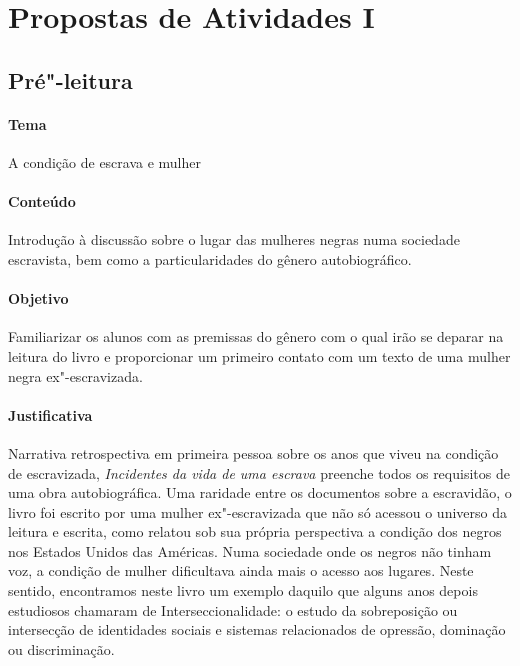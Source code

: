 \documentclass[11pt]{extarticle}
\begin{document}
\tableofcontents


\section{Propostas de Atividades I}


\subsection{Pré"-leitura}

\paragraph{Tema} A condição de escrava e mulher

\paragraph{Conteúdo} Introdução à discussão sobre o lugar das mulheres negras
numa sociedade escravista, bem como a particularidades do gênero autobiográfico.

\paragraph{Objetivo} Familiarizar os alunos com as premissas do gênero com o qual
irão se deparar na leitura do livro e proporcionar um primeiro contato com um texto
de uma mulher negra ex"-escravizada.

\paragraph{Justificativa} Narrativa retrospectiva em primeira pessoa sobre os anos 
que viveu na condição de escravizada, \emph{Incidentes da vida de uma escrava} 
preenche todos os requisitos de uma obra autobiográfica. Uma raridade entre os 
documentos sobre a escravidão, o livro foi escrito por uma mulher ex"-escravizada 
que não só acessou o universo da leitura e escrita, como relatou sob sua própria perspectiva 
a condição dos negros nos Estados Unidos das Américas. 
Numa sociedade onde os negros não tinham voz, a condição de mulher dificultava ainda mais
o acesso aos lugares. Neste sentido, encontramos neste livro um exemplo daquilo que alguns anos
depois estudiosos chamaram de Interseccionalidade: o estudo da sobreposição ou intersecção de 
identidades sociais e sistemas relacionados de opressão, dominação ou discriminação.
\end{document}
